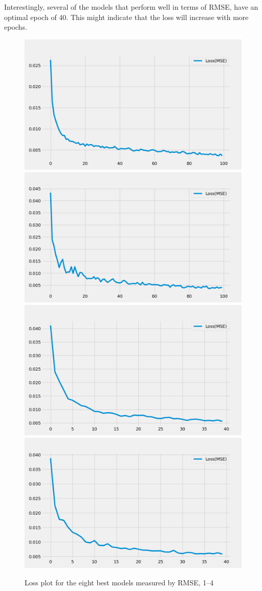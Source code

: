 Interestingly, several of the models that perform well in terms of RMSE, have an optimal epoch of 40. This might indicate that the loss will increase with more epochs. 
\begin{figure}[H]
    \includegraphics[width=.48\textwidth]{../data/Figures/Neural networks/ForLoop_Tensor/plotLoss_186.png}\hfill
    \includegraphics[width=.48\textwidth]{../data/Figures/Neural networks/ForLoop_Tensor/plotLoss_72.png}\hfill
    \\[\smallskipamount]
    \includegraphics[width=.48\textwidth]{../data/Figures/Neural networks/ForLoop_Tensor/plotLoss_286.png}\hfill
    \includegraphics[width=.48\textwidth]{../data/Figures/Neural networks/ForLoop_Tensor/plotLoss_46.png}\caption{Loss plot for the eight best models measured by RMSE, 1--4}\label{fig:loss_14}
\end{figure}
